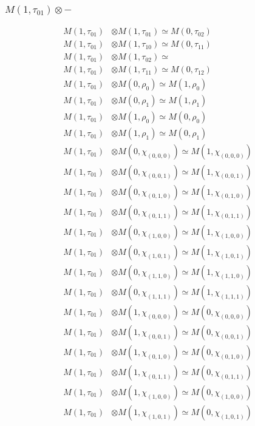\subsubsection{$ M(1,\tau_{01})\otimes -$}
\begin{align*}
M(1,\tau_{01}) &\otimes M(1,\tau_{01}) \simeq M(0,\tau_{02}) \\
M(1,\tau_{01}) &\otimes M(1,\tau_{10}) \simeq M(0,\tau_{11}) \\
M(1,\tau_{01}) &\otimes M(1,\tau_{02}) \simeq  \\
M(1,\tau_{01}) &\otimes M(1,\tau_{11}) \simeq M(0,\tau_{12}) \\
M(1,\tau_{01}) &\otimes M(0,\rho_{0}) \simeq M(1,\rho_{0}) \\
M(1,\tau_{01}) &\otimes M(0,\rho_{1}) \simeq M(1,\rho_{1}) \\
M(1,\tau_{01}) &\otimes M(1,\rho_{0}) \simeq M(0,\rho_{0}) \\
M(1,\tau_{01}) &\otimes M(1,\rho_{1}) \simeq M(0,\rho_{1}) \\
M(1,\tau_{01}) &\otimes M(0,\chi_{(0,0,0)}) \simeq M(1,\chi_{(0,0,0)}) \\
M(1,\tau_{01}) &\otimes M(0,\chi_{(0,0,1)}) \simeq M(1,\chi_{(0,0,1)}) \\
M(1,\tau_{01}) &\otimes M(0,\chi_{(0,1,0)}) \simeq M(1,\chi_{(0,1,0)}) \\
M(1,\tau_{01}) &\otimes M(0,\chi_{(0,1,1)}) \simeq M(1,\chi_{(0,1,1)}) \\
M(1,\tau_{01}) &\otimes M(0,\chi_{(1,0,0)}) \simeq M(1,\chi_{(1,0,0)}) \\
M(1,\tau_{01}) &\otimes M(0,\chi_{(1,0,1)}) \simeq M(1,\chi_{(1,0,1)}) \\
M(1,\tau_{01}) &\otimes M(0,\chi_{(1,1,0)}) \simeq M(1,\chi_{(1,1,0)}) \\
M(1,\tau_{01}) &\otimes M(0,\chi_{(1,1,1)}) \simeq M(1,\chi_{(1,1,1)}) \\
M(1,\tau_{01}) &\otimes M(1,\chi_{(0,0,0)}) \simeq M(0,\chi_{(0,0,0)}) \\
M(1,\tau_{01}) &\otimes M(1,\chi_{(0,0,1)}) \simeq M(0,\chi_{(0,0,1)}) \\
M(1,\tau_{01}) &\otimes M(1,\chi_{(0,1,0)}) \simeq M(0,\chi_{(0,1,0)}) \\
M(1,\tau_{01}) &\otimes M(1,\chi_{(0,1,1)}) \simeq M(0,\chi_{(0,1,1)}) \\
M(1,\tau_{01}) &\otimes M(1,\chi_{(1,0,0)}) \simeq M(0,\chi_{(1,0,0)}) \\
M(1,\tau_{01}) &\otimes M(1,\chi_{(1,0,1)}) \simeq M(0,\chi_{(1,0,1)}) \\

\end{align*}
